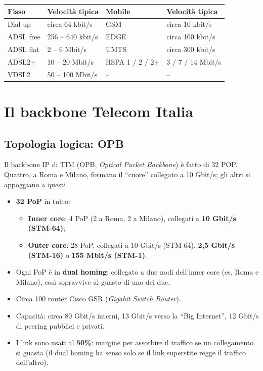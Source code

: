 \begin{longtable}[]{@{}llll@{}}
\toprule\noalign{}
Fisso & Velocità tipica & Mobile & Velocità tipica \\
\midrule\noalign{}
\endhead
\bottomrule\noalign{}
\endlastfoot
Dial-up & circa 64 kbit/s & GSM & circa 10 kbit/s \\
ADSL free & 256 -- 640 kbit/s & EDGE & circa 100 kbit/s \\
ADSL flat & 2 -- 6 Mbit/s & UMTS & circa 300 kbit/s \\
ADSL2+ & 10 -- 20 Mbit/s & HSPA 1 / 2 / 2+ & 3 / 7 / 14 Mbit/s \\
VDSL2 & 50 -- 100 Mbit/s & -- & -- \\
\end{longtable}

\section{Il backbone Telecom Italia}

\subsection{Topologia logica: OPB}

\begin{inbreve}

Il backbone IP di TIM (OPB, \emph{Optical Packet Backbone}) è fatto di 32 POP. Quattro, a Roma e Milano, formano il ``cuore'' collegato a 10 Gbit/s; gli altri si appoggiano a questi.

\end{inbreve}

\begin{itemize}
\tightlist
\item
  \textbf{32 PoP} in tutto:

  \begin{itemize}
  \tightlist
  \item
    \textbf{Inner core}: 4 PoP (2 a Roma, 2 a Milano), collegati a \textbf{10 Gbit/s (STM-64)};
  \item
    \textbf{Outer core}: 28 PoP, collegati a 10 Gbit/s (STM-64), \textbf{2,5 Gbit/s (STM-16)} o \textbf{155 Mbit/s (STM-1)}.
  \end{itemize}
\item
  Ogni PoP è in \textbf{dual homing}: collegato a due nodi dell'inner core (es. Roma e Milano), così sopravvive al guasto di uno dei due.
\item
  Circa 100 router Cisco GSR (\emph{Gigabit Switch Router}).
\item
  Capacità: circa 80 Gbit/s interni, 13 Gbit/s verso la ``Big Internet'', 12 Gbit/s di peering pubblici e privati.
\item
  I link sono usati al \textbf{50\%}: margine per assorbire il traffico se un collegamento si guasta (il dual homing ha senso solo se il link superstite regge il traffico dell'altro).
\end{itemize}


